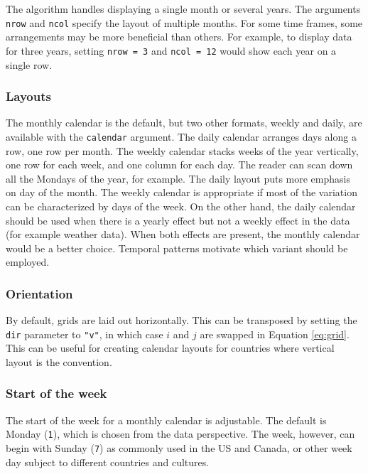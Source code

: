 \documentclass[12pt]{article}
\begin{document}
The algorithm handles displaying a single month or several years. The arguments \texttt{nrow} and \texttt{ncol} specify the layout of multiple months. For some time frames, some arrangements may be more beneficial than others. For example, to display data for three years, setting \texttt{nrow\ =\ 3} and \texttt{ncol\ =\ 12} would show each year on a single row.

\hypertarget{layouts}{%
\subsubsection{Layouts}\label{layouts}}

The monthly calendar is the default, but two other formats, weekly and daily, are available with the \texttt{calendar} argument. The daily calendar arranges days along a row, one row per month. The weekly calendar stacks weeks of the year vertically, one row for each week, and one column for each day. The reader can scan down all the Mondays of the year, for example. The daily layout puts more emphasis on day of the month. The weekly calendar is appropriate if most of the variation can be characterized by days of the week. On the other hand, the daily calendar should be used when there is a yearly effect but not a weekly effect in the data (for example weather data). When both effects are present, the monthly calendar would be a better choice. Temporal patterns motivate which variant should be employed.

\hypertarget{orientation}{%
\subsubsection{Orientation}\label{orientation}}

By default, grids are laid out horizontally. This can be transposed by setting the \texttt{dir} parameter to \texttt{"v"}, in which case \(i\) and \(j\) are swapped in Equation \eqref{eq:grid}. This can be useful for creating calendar layouts for countries where vertical layout is the convention.

\hypertarget{start-of-the-week}{%
\subsubsection{Start of the week}\label{start-of-the-week}}

The start of the week for a monthly calendar is adjustable. The default is Monday (\texttt{1}), which is chosen from the data perspective. The week, however, can begin with Sunday (\texttt{7}) as commonly used in the US and Canada, or other week day subject to different countries and cultures.
\end{document}
